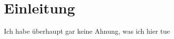 \chapter{Einleitung}\label{chapter:einleitung}
Ich habe überhaupt gar keine Ahnung, was ich hier tue